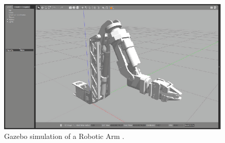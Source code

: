 \documentclass[12pt,oneside]{article}
\begin{document}
\begin{figure}[H]
\centering
\includegraphics[width=0.9\linewidth]{gazebo_robotic_arm}
\caption{Gazebo simulation of a Robotic Arm \cite{yigit2020trajectory}.}
\label{fig:gazeboroboticarm}
\end{figure}
\end{document}
